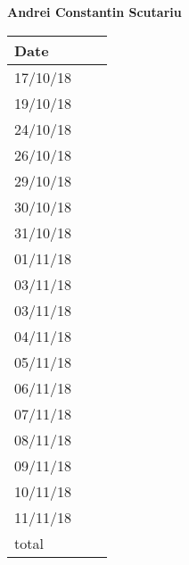 \documentclass[../main.tex]{subfiles}
\begin{document}
\begin{center}
	{\bf Andrei Constantin Scutariu}
	\vspace{2mm}

		\begin{tabular}{p{1.3cm}|p{1.8cm}|p{6.7cm}}
			\hline
			\bf Date & \bf \makebox[1.8cm][c]{Hours} & \bf \makebox[6.7cm][c]{Description} \\
			\hline
			17/10/18 & \makebox[1.8cm][c]{2h} & \makebox[6.7cm][c]{Introduction}\\
			19/10/18 & \makebox[1.8cm][c]{3h} & \makebox[6.7cm][c]{Goals, Requirements, Domain assumptions}\\
			24/10/18 & \makebox[1.8cm][c]{4h} & \makebox[6.7cm][c]{Goals, Requirements, Domain assumptions}\\
			26/10/18 & \makebox[1.8cm][c]{1h} & \makebox[6.7cm][c]{Purpose, Scope}\\
			29/10/18 & \makebox[1.8cm][c]{2h} & \makebox[6.7cm][c]{UML Class Diagrams}\\
			30/10/18 & \makebox[1.8cm][c]{1h} & \makebox[6.7cm][c]{Purpose, Scope}\\
			31/10/18 & \makebox[1.8cm][c]{3h} & \makebox[6.7cm][c]{UML Class Diagrams}\\
			01/11/18 & \makebox[1.8cm][c]{1h} & \makebox[6.7cm][c]{Use Cases \& Scenarios}\\
			03/11/18 & \makebox[1.8cm][c]{1h} & \makebox[6.7cm][c]{Mockups, Scenarios}\\
			03/11/18 & \makebox[1.8cm][c]{2h} & \makebox[6.7cm][c]{UML Class \& State Machine Diagrams}\\
			04/11/18 & \makebox[1.8cm][c]{3h} & \makebox[6.7cm][c]{Specific Requirements}\\
			05/11/18 & \makebox[1.8cm][c]{1h} & \makebox[6.7cm][c]{Goals, Requirements, Domain assumptions}\\
			06/11/18 & \makebox[1.8cm][c]{1h} & \makebox[6.7cm][c]{Mockups}\\
			07/11/18 & \makebox[1.8cm][c]{4h} & \makebox[6.7cm][c]{Alloy}\\
			08/11/18 & \makebox[1.8cm][c]{5h} & \makebox[6.7cm][c]{Alloy, Revisioning}\\
			09/11/18 & \makebox[1.8cm][c]{4h} & \makebox[6.7cm][c]{Alloy}\\
			10/11/18 & \makebox[1.8cm][c]{5h} & \makebox[6.7cm][c]{Alloy, Revisioning}\\
			11/11/18 & \makebox[1.8cm][c]{4h} & \makebox[6.7cm][c]{Revisioning}\\
			total    & \makebox[1.8cm][c]{47h}
		\end{tabular}
\end{center}
\vspace{1cm}
\end{document}
